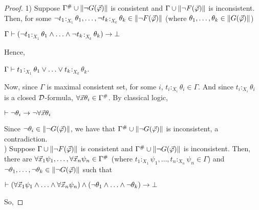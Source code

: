 \begin{proof} 
	
	1) Suppose $\Gamma^{\#} \cup \Arrowvert \neg G(\vec{\varphi}) \Arrowvert$ is consistent and  $\Gamma \cup \Arrowvert \neg F(\vec{\varphi}) \Arrowvert$ is inconsistent. Then, for some $\neg t_{1}$$:_{X_{1}}$$\theta_{1}, \dots,  \neg t_{k}$$:_{X_{k}}$$\theta_{k} \in  \Arrowvert \neg F(\vec{\varphi}) \Arrowvert$ (where $\theta_{1}, \dots, \theta_{k} \in  \Arrowvert  G(\vec{\varphi}) \Arrowvert$)
	
	
	\begin{center}
		$\Gamma \vdash (\neg t_{1}$$:_{X_{1}}$$\theta_{1} \e \dots \e  \nao t_{k}$$:_{X_{k}}$$\theta_{k}) \rightarrow \bot $
	\end{center}    
Hence,
	
	\begin{center}
		$\Gamma \vdash t_{1}$$:_{X_{1}}$$\theta_{1} \ou \dots \ou   t_{k}$$:_{X_{k}}$$\theta_{k}$.
	\end{center}        
	
	
\qquad Now, since $\Gamma$ is maximal consistent set, for some $i$, $t_{i}$$:_{X_{i}}$$\theta_{i} \in \Gamma$. And since $t_{i}$$:_{X_{i}}$$\theta_{i}$ is a closed $\mathcal{D}$-formula, $\forall \vec{x} \theta_{i} \in \Gamma^{\#}$. By classical logic, 
	
	\begin{center}
		$\vdash \neg \theta_{i} \rightarrow \neg \forall \vec{x} \theta_{i}$
	\end{center}        
	
\qquad Since $\neg \theta_{i} \in \Arrowvert  \neg G(\vec{\varphi}) \Arrowvert$, we have that  $\Gamma^{\#} \cup \Arrowvert \neg G(\vec{\varphi}) \Arrowvert$ is inconsistent, a contradiction.\\
	
	
) Suppose $\Gamma \cup \Arrowvert \neg F(\vec{\varphi}) \Arrowvert$ is consistent and $\Gamma^{\#} \cup \Arrowvert \neg G(\vec{\varphi}) \Arrowvert$ is inconsistent. Then, there are $\forall \vec{x}_{1} \psi_{1}, \dots, \forall \vec{x}_{n} \psi_{n} \in \Gamma^{\#}$ (where $t_{1}$$:_{X_{1}}$$\psi_{1}, \dots,  t_{n}$$:_{X_{n}}$$\psi_{n} \in  \Gamma$) and $\neg \theta_{1}, \dots, \neg \theta_{k} \in \Arrowvert  \neg G(\vec{\varphi}) \Arrowvert$ such that
	
	
	\begin{center}
		$\teo (\todo \vec{x}_{1} \psi_{1} \e \dots \e \todo \vec{x}_{n} \psi_{n}) \e  (\nao \theta_{1}\e \dots \e \nao \theta_{k}) \impli \bot $
	\end{center}
So,
	

\end{proof}
